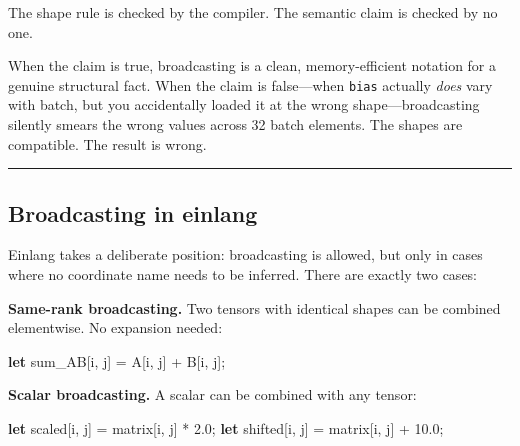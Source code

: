 \documentclass[11pt,]{article}
\newenvironment{Shaded}{}{}
\newcommand{\DecValTok}[1]{\textcolor[rgb]{0.25,0.63,0.44}{#1}}
\newcommand{\KeywordTok}[1]{\textcolor[rgb]{0.00,0.44,0.13}{\textbf{#1}}}
\newcommand{\NormalTok}[1]{#1}
\newcommand{\OperatorTok}[1]{\textcolor[rgb]{0.40,0.40,0.40}{#1}}
\begin{document}
The shape rule is checked by the compiler. The semantic claim is checked
by no one.

When the claim is true, broadcasting is a clean, memory-efficient
notation for a genuine structural fact. When the claim is false---when
\texttt{bias} actually \emph{does} vary with batch, but you accidentally
loaded it at the wrong shape---broadcasting silently smears the wrong
values across 32 batch elements. The shapes are compatible. The result
is wrong.

\begin{center}\rule{0.5\linewidth}{0.4pt}\end{center}

\hypertarget{broadcasting-in-einlang}{%
\subsection{Broadcasting in einlang}\label{broadcasting-in-einlang}}

Einlang takes a deliberate position: broadcasting is allowed, but only
in cases where no coordinate name needs to be inferred. There are
exactly two cases:

\textbf{Same-rank broadcasting.} Two tensors with identical shapes can
be combined elementwise. No expansion needed:

\begin{Shaded}
\begin{Highlighting}[]
\KeywordTok{let}\NormalTok{ sum_AB}\OperatorTok{[}\NormalTok{i, j}\OperatorTok{]}\NormalTok{ = A}\OperatorTok{[}\NormalTok{i, j}\OperatorTok{]}\NormalTok{ + B}\OperatorTok{[}\NormalTok{i, j}\OperatorTok{]}\NormalTok{;}
\end{Highlighting}
\end{Shaded}

\textbf{Scalar broadcasting.} A scalar can be combined with any tensor:

\begin{Shaded}
\begin{Highlighting}[]
\KeywordTok{let}\NormalTok{ scaled}\OperatorTok{[}\NormalTok{i, j}\OperatorTok{]}\NormalTok{ = matrix}\OperatorTok{[}\NormalTok{i, j}\OperatorTok{]}\NormalTok{ * }\DecValTok{2.0}\NormalTok{;}
\KeywordTok{let}\NormalTok{ shifted}\OperatorTok{[}\NormalTok{i, j}\OperatorTok{]}\NormalTok{ = matrix}\OperatorTok{[}\NormalTok{i, j}\OperatorTok{]}\NormalTok{ + }\DecValTok{10.0}\NormalTok{;}
\end{Highlighting}
\end{Shaded}
\end{document}
